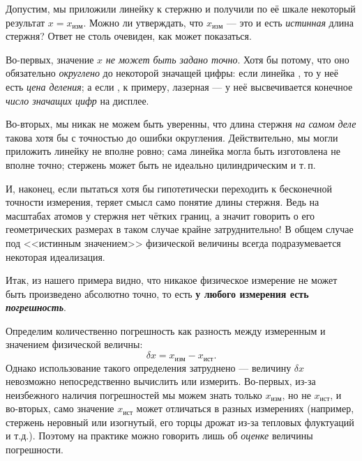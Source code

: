 Допустим, мы приложили линейку к стержню и получили по её шкале некоторый результат $x=x_{изм}$. Можно ли утверждать, что $x_{изм}$ --- это и есть \emph{истинная} длина стержня? Ответ не столь очевиден, как может показаться.

Во-первых, значение $x$ \emph{не может быть задано точно}. Хотя бы
потому, что оно обязательно \emph{округлено} до некоторой значащей
цифры: если линейка , то у неё
есть \emph{цена деления}; а если , к примеру, лазерная
--- у неё высвечивается конечное \emph{число значащих цифр}
на дисплее.

Во-вторых, мы никак не можем быть уверенны, что длина стержня \emph{на
самом деле} такова хотя бы с точностью до ошибки округления. Действительно,
мы могли приложить линейку не вполне ровно; сама линейка могла быть
изготовлена не вполне точно; стержень может быть не идеально цилиндрическим
и т.\,п.

И, наконец, если пытаться хотя бы гипотетически переходить к бесконечной
точности измерения, теряет смысл само понятие  длины стержня. Ведь на масштабах атомов у стержня нет чётких границ, а значит говорить о его
геометрических размерах в таком случае крайне затруднительно! В общем случае 
под <<истинным значением>> физической величины всегда подразумевается 
некоторая идеализация.

Итак, из нашего примера видно, что никакое физическое измерение не может быть
произведено абсолютно точно, то есть
\textbf{у любого измерения есть \emph{погрешность}}.%

Определим количественно погрешность как разность между измеренным и  значением физической величны:
\[\delta x=x_{\text{изм}}-x_{\text{ист}}.\]
Однако использование такого определения затруднено ---
величину $\delta x$ невозможно непосредственно вычислить или измерить. Во-первых, из-за неизбежного наличия погрешностей мы можем знать только $x_{изм}$,
но не $x_{ист}$, и во-вторых, само значение $x_{ист}$ может отличаться в разных измерениях (например, стержень
неровный или изогнутый, его торцы дрожат из-за тепловых флуктуаций и т.д.).
Поэтому на практике можно говорить лишь об \emph{оценке} величины погрешности.

